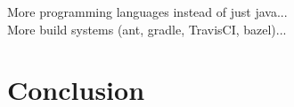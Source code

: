 \documentclass[conference]{IEEEtran}
\begin{document}
More programming languages instead of just java...\\

More build systems (ant, gradle, TravisCI, bazel)...\\

\section{Conclusion}






  
%

\end{document}
